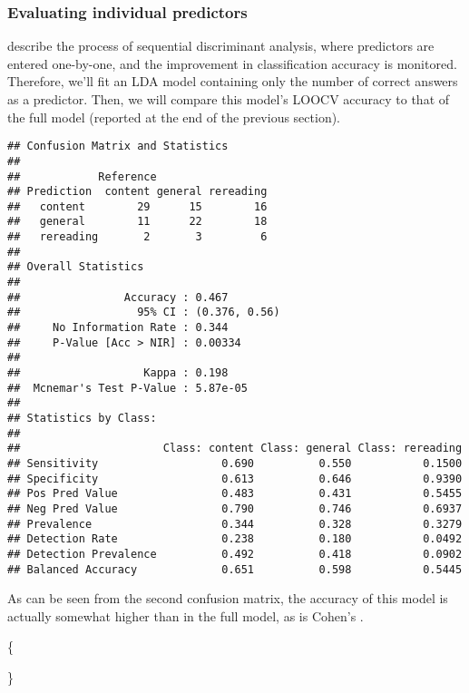 \documentclass[12pt,]{article}
\newenvironment{Shaded}{\begin{snugshade}}{\end{snugshade}}
\newcommand{\DataTypeTok}[1]{\textcolor[rgb]{0.13,0.29,0.53}{#1}}
\newcommand{\KeywordTok}[1]{\textcolor[rgb]{0.13,0.29,0.53}{\textbf{#1}}}
\newcommand{\NormalTok}[1]{#1}
\newcommand{\OperatorTok}[1]{\textcolor[rgb]{0.81,0.36,0.00}{\textbf{#1}}}
\newcommand{\StringTok}[1]{\textcolor[rgb]{0.31,0.60,0.02}{#1}}
\begin{document}
\hypertarget{evaluating-individual-predictors}{%
\subsubsection{Evaluating individual
predictors}\label{evaluating-individual-predictors}}

\citet{tabachnick_using_2012} describe the process of sequential
discriminant analysis, where predictors are entered one-by-one, and the
improvement in classification accuracy is monitored. Therefore, we'll
fit an LDA model containing only the number of correct answers as a
predictor. Then, we will compare this model's LOOCV accuracy to that of
the full model (reported at the end of the previous section).

\begin{Shaded}
\end{Shaded}

\begin{verbatim}
## Confusion Matrix and Statistics
## 
##            Reference
## Prediction  content general rereading
##   content        29      15        16
##   general        11      22        18
##   rereading       2       3         6
## 
## Overall Statistics
##                                        
##                Accuracy : 0.467        
##                  95% CI : (0.376, 0.56)
##     No Information Rate : 0.344        
##     P-Value [Acc > NIR] : 0.00334      
##                                        
##                   Kappa : 0.198        
##  Mcnemar's Test P-Value : 5.87e-05     
## 
## Statistics by Class:
## 
##                      Class: content Class: general Class: rereading
## Sensitivity                   0.690          0.550           0.1500
## Specificity                   0.613          0.646           0.9390
## Pos Pred Value                0.483          0.431           0.5455
## Neg Pred Value                0.790          0.746           0.6937
## Prevalence                    0.344          0.328           0.3279
## Detection Rate                0.238          0.180           0.0492
## Detection Prevalence          0.492          0.418           0.0902
## Balanced Accuracy             0.651          0.598           0.5445
\end{verbatim}

As can be seen from the second confusion matrix, the accuracy of this
model is actually somewhat higher than in the full model, as is Cohen's
\textKappa.



\{ 



\}
\end{document}
